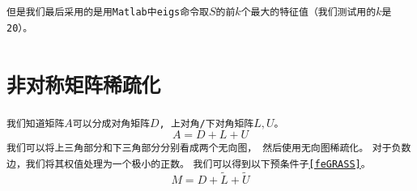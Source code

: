 \documentclass[11pt, a4paper]{article}
\theoremstyle{plain}
\theoremstyle{plain}
\theoremstyle{plain}
\theoremstyle{definition}
\theoremstyle{remark}
\theoremstyle{definition}
\newcommand{\T}[1]{\texttt{#1}}
\begin{document}
\T{但是我们最后采用的是用Matlab中eigs命令取$S$的前$k$个最大的特征值（我们测试用的$k$是20）。}


\section{\T{非对称矩阵稀疏化}}
\T{我们知道矩阵$A$可以分成对角矩阵$D$, 上对角/下对角矩阵$L, U$。}
\begin{equation}
	A = D + L + U
\end{equation}
\T{我们可以将上三角部分和下三角部分分别看成两个无向图， 然后使用无向图稀疏化\cite{Sparse}。}
\T{对于负数边，我们将其权值处理为一个极小的正数。}
\T{我们可以得到以下预条件子\ref{feGRASS}。}
\begin{equation}
	\label{feGRASS}
	\tag{图稀疏化预条件子}
	M = D + \tilde{L} + \tilde{U}
\end{equation}
\end{document}
